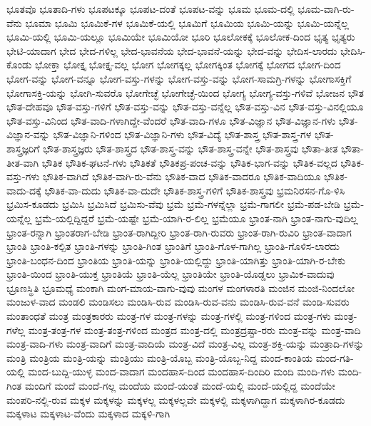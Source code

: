 {ಭೂತವೊ
ಭೂತಾದಿ-ಗಳು
ಭೂಪಟಕ್ಕೂ
ಭೂಪಟ-ದಂತೆ
ಭೂಪಟ-ವನ್ನು
ಭೂಮ
ಭೂಮ-ದಲ್ಲಿ
ಭೂಮ-ವಾಗಿ-ರು-ವೆನು
ಭೂಮಾ
ಭೂಮಿ
ಭೂಮಿಕೆ-ಗಳ
ಭೂಮಿಕೆ-ಯಲ್ಲಿ
ಭೂಮಿಗೆ
ಭೂಮಿಯ
ಭೂಮಿ-ಯನ್ನು
ಭೂಮಿ-ಯನ್ನೆಲ್ಲ
ಭೂಮಿ-ಯಲ್ಲಿ
ಭೂಮಿ-ಯಲ್ಲೂ
ಭೂಮಿಯೇ
ಭೂಮಿಯೋ
ಭೂರಿ
ಭೂಲೋಕಕ್ಕೆ
ಭೂಲೋಕ-ದಿಂದ
ಭೃತ್ಯ
ಭೃತ್ಯರು
ಭೇಟಿ-ಯಾದಾಗ
ಭೇದ
ಭೇದ-ಗಳಿಲ್ಲ
ಭೇದ-ಭಾವನೆಯ
ಭೇದ-ಭಾವನೆ-ಯನ್ನು
ಭೇದ-ವನ್ನು
ಭೇದಿಸ-ಲಾರದು
ಭೇದಿಸಿ-ಕೊಂಡು
ಭೋಕ್ತಾ
ಭೋಕ್ತೃ
ಭೋಕ್ತೃ-ವಲ್ಲ
ಭೋಗ
ಭೋಗಕ್ಕಲ್ಲ
ಭೋಗಕ್ಕಿಂತ
ಭೋಗಕ್ಕೆ
ಭೋಗದ
ಭೋಗ-ದಿಂದ
ಭೋಗ-ವನ್ನು
ಭೋಗ-ವನ್ನೂ
ಭೋಗ-ವಸ್ತು-ಗಳನ್ನು
ಭೋಗ-ವಸ್ತು-ವನ್ನು
ಭೋಗ-ಸಾಮಗ್ರಿ-ಗಳನ್ನು
ಭೋಗಾಸಕ್ತಿಗೆ
ಭೋಗಾಸಕ್ತಿ-ಯನ್ನು
ಭೋಗಿ-ಸುವರೊ
ಭೋಗೇಚ್ಛೆ
ಭೋಗೇಚ್ಛೆ-ಯಿಂದ
ಭೋಗ್ಯ
ಭೋಗ್ಯ-ವಸ್ತು-ಗಳಿವೆ
ಭೋಜನ
ಭೌತ
ಭೌತ-ದೇಹವೂ
ಭೌತ-ವಸ್ತು-ಗಳಿಗೆ
ಭೌತ-ವಸ್ತು-ವನ್ನು
ಭೌತ-ವಸ್ತು-ವನ್ನೆಲ್ಲ
ಭೌತ-ವಸ್ತು-ವಿನ
ಭೌತ-ವಸ್ತು-ವಿನಲ್ಲಿಯೂ
ಭೌತ-ವಸ್ತು-ವಿನಿಂದ
ಭೌತ-ವಾದಿ-ಗಳಾಗಿದ್ದೇ-ವೆಂದರೆ
ಭೌತ-ವಾದಿ-ಗಳೂ
ಭೌತ-ವಿಜ್ಞಾನ
ಭೌತ-ವಿಜ್ಞಾನ-ಗಳು
ಭೌತ-ವಿಜ್ಞಾನ-ವನ್ನು
ಭೌತ-ವಿಜ್ಞಾನಿ-ಗಳಿಂದ
ಭೌತ-ವಿಜ್ಞಾನಿ-ಗಳು
ಭೌತ-ವಿದ್ಯೆ
ಭೌತ-ಶಾಸ್ತ್ರ
ಭೌತ-ಶಾಸ್ತ್ರ-ಗಳ
ಭೌತ-ಶಾಸ್ತ್ರಜ್ಞರಿಗೆ
ಭೌತ-ಶಾಸ್ತ್ರಜ್ಞರು
ಭೌತ-ಶಾಸ್ತ್ರದ
ಭೌತ-ಶಾಸ್ತ್ರ-ವನ್ನು
ಭೌತ-ಶಾಸ್ತ್ರ-ವನ್ನೇ
ಭೌತ-ಶಾಸ್ತ್ರವು
ಭೌತಾ-ತೀತ
ಭೌತಾ-ತೀತ-ವಾಗಿ
ಭೌತಿಕ
ಭೌತಿಕ-ಘಟನೆ-ಗಳು
ಭೌತಿಕತೆ
ಭೌತಿಕಪ್ರ-ಪಂಚ-ವನ್ನು
ಭೌತಿಕ-ಭಾಗ-ವನ್ನು
ಭೌತಿಕ-ವಲ್ಲದ
ಭೌತಿಕ-ವಸ್ತು-ಗಳು
ಭೌತಿಕ-ವಾಗಿದೆ
ಭೌತಿಕ-ವಾಗಿ-ರು-ವೆನು
ಭೌತಿಕ-ವಾದ
ಭೌತಿಕ-ವಾದರೂ
ಭೌತಿಕ-ವಾದಿಯೂ
ಭೌತಿಕ-ವಾದು-ದಕ್ಕೆ
ಭೌತಿಕ-ವಾ-ದುದು
ಭೌತಿಕ-ವಾ-ದುದೇ
ಭೌತಿಕ-ಶಾಸ್ತ್ರ-ಗಳಿಗೆ
ಭೌತಿಕ-ಶಾಸ್ತ್ರವು
ಭ್ರಮನಿರಸನ-ಗೊ-ಳಿಸಿ
ಭ್ರಮಿಸ-ಕೂಡದು
ಭ್ರಮಿಸಿ
ಭ್ರಮಿಸಿದೆ
ಭ್ರಮಿಸು-ವೆವು
ಭ್ರಮೆ
ಭ್ರಮೆ-ಗಳನ್ನೆಲ್ಲಾ
ಭ್ರಮೆ-ಗಾಗಲೀ
ಭ್ರಮೆ-ಪಡ-ಬೇಡಿ
ಭ್ರಮೆ-ಯನ್ನೆಲ್ಲ
ಭ್ರಮೆ-ಯಲ್ಲಿದ್ದಿದ್ದರೆ
ಭ್ರಮೆ-ಯಷ್ಟೇ
ಭ್ರಮೆ-ಯಾಗಿ-ರ-ಲಿಲ್ಲ
ಭ್ರಮೆಯೂ
ಭ್ರಾಂತ-ನಾಗಿ
ಭ್ರಾಂತ-ನಾಗು-ವುದಿಲ್ಲ
ಭ್ರಾಂತ-ರನ್ನಾಗಿ
ಭ್ರಾಂತರಾಗ-ಬೇಡಿ
ಭ್ರಾಂತ-ರಾಗಿದ್ದೀರಿ
ಭ್ರಾಂತ-ರಾಗಿ-ರುವರು
ಭ್ರಾಂತ-ರಾಗಿ-ರುವಿರಿ
ಭ್ರಾಂತ-ವಾದಾಗ
ಭ್ರಾಂತಿ
ಭ್ರಾಂತಿ-ಕಲ್ಪಿತ
ಭ್ರಾಂತಿ-ಗಳನ್ನು
ಭ್ರಾಂತಿ-ಗಿಂತ
ಭ್ರಾಂತಿಗೆ
ಭ್ರಾಂತಿ-ಗೊಳ-ಗಾಗಿಲ್ಲ
ಭ್ರಾಂತಿ-ಗೊಳಿಸ-ಲಾರದು
ಭ್ರಾಂತಿ-ಬಂಧನ-ದಿಂದ
ಭ್ರಾಂತಿಯ
ಭ್ರಾಂತಿ-ಯನ್ನು
ಭ್ರಾಂತಿ-ಯಲ್ಲಿದ್ದು
ಭ್ರಾಂತಿ-ಯಾಗಿತ್ತು
ಭ್ರಾಂತಿ-ಯಾಗಿ-ರ-ಬೇಕು
ಭ್ರಾಂತಿ-ಯಿಂದ
ಭ್ರಾಂತಿ-ಯುಕ್ತ
ಭ್ರಾಂತಿಯೆ
ಭ್ರಾಂತಿ-ಯೆಲ್ಲ
ಭ್ರಾಂತಿಯೇ
ಭ್ರಾಂತಿ-ಯೊಡ್ಡಲು
ಭ್ರಾಮಿಕ-ವಾದುವು
ಭ್ರೂಣಸ್ಥಿತಿ
ಭ್ರೂಮಧ್ಯೆ
ಮಂಕಾಗಿ
ಮಂಗ-ಮಾಯ-ವಾಗು-ವುವು
ಮಂಗಳ
ಮಂಗಳಾರತಿ
ಮಂಜಿನ
ಮಂಜಿ-ನಿಂದಲೋ
ಮಂಜುಳ-ವಾದ
ಮಂಡಲಿ
ಮಂಡಿಸಲು
ಮಂಡಿಸಿ-ರುವ
ಮಂಡಿಸಿ-ರುವ-ವನು
ಮಂಡಿಸಿ-ರುವ-ವನೆ
ಮಂಡಿ-ಸುವರು
ಮಂತಾಂಧತೆ
ಮಂತ್ರ
ಮಂತ್ರಕಾರರು
ಮಂತ್ರ-ಗಳ
ಮಂತ್ರ-ಗಳನ್ನು
ಮಂತ್ರ-ಗಳಲ್ಲಿ
ಮಂತ್ರ-ಗಳಿಂದ
ಮಂತ್ರ-ಗಳು
ಮಂತ್ರ-ಗಳೆಲ್ಲ
ಮಂತ್ರ-ತಂತ್ರ-ಗಳ
ಮಂತ್ರ-ತಂತ್ರ-ಗಳಿಂದ
ಮಂತ್ರದ
ಮಂತ್ರ-ದಲ್ಲಿ
ಮಂತ್ರದ್ರಷ್ಟಾ-ರರು
ಮಂತ್ರ-ವನ್ನು
ಮಂತ್ರ-ವಾದಿ
ಮಂತ್ರ-ವಾದಿ-ಗಳು
ಮಂತ್ರ-ವಾದಿಗೆ
ಮಂತ್ರ-ವಾದಿಯೆ
ಮಂತ್ರ-ವಿದೆ
ಮಂತ್ರ-ವಿಲ್ಲ
ಮಂತ್ರ-ಶಕ್ತಿ-ಯನ್ನು
ಮಂತ್ರಾದಿ-ಗಳನ್ನು
ಮಂತ್ರಿ
ಮಂತ್ರಿಯ
ಮಂತ್ರಿ-ಯನ್ನು
ಮಂತ್ರಿಯು
ಮಂತ್ರಿ-ಯೊಬ್ಬ
ಮಂತ್ರಿ-ಯೊಬ್ಬ-ನಿದ್ದ
ಮಂದ-ಕಾಂತಿಯ
ಮಂದ-ಗತಿ-ಯಲ್ಲಿ
ಮಂದ-ಬುದ್ದಿ-ಯುಳ್ಳ
ಮಂದ-ವಾದಾಗ
ಮಂದಹಾಸ-ದಿಂದ
ಮಂದಹಾಸ-ದಿಂದಿರಿ
ಮಂದಿ
ಮಂದಿ-ಗಳು
ಮಂದಿ-ಗಿಂತ
ಮಂದಿಗೆ
ಮಂದೆ
ಮಂದೆ-ಗಲ್ಲ
ಮಂದೆಯ
ಮಂದೆ-ಯಂತೆ
ಮಂದೆ-ಯಲ್ಲಿ
ಮಂದೆ-ಯಲ್ಲಿದ್ದ
ಮಂದೆಯೇ
ಮಂಪರಿ-ನಲ್ಲಿ-ರುವ
ಮಕ್ಕಳ
ಮಕ್ಕಳನ್ನು
ಮಕ್ಕಳಲ್ಲ
ಮಕ್ಕಳಲ್ಲವೇ
ಮಕ್ಕಳಲ್ಲಿ
ಮಕ್ಕಳಾಗಿದ್ದಾಗ
ಮಕ್ಕಳಾಗಿರ-ಕೂಡದು
ಮಕ್ಕಳಾಟ
ಮಕ್ಕಳಾಟ-ವೆಂದು
ಮಕ್ಕಳಾದ
ಮಕ್ಕಳಿ-ಗಾಗಿ
}
